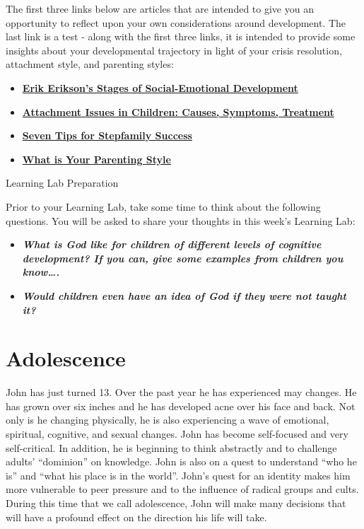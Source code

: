 \documentclass[
]{book}
\providecommand{\tightlist}{%
  \setlength{\itemsep}{0pt}\setlength{\parskip}{0pt}}
\begin{document}
\begin{reflect}
The first three links below are articles that are intended to give you an opportunity to reflect upon your own considerations around development. The last link is a test - along with the first three links, it is intended to provide some insights about your developmental trajectory in light of your crisis resolution, attachment style, and parenting styles:

\begin{itemize}
\tightlist
\item
  \href{http://www.childdevelopmentinfo.com/development/erickson.shtml}{\textbf{Erik Erikson's Stages of Social-Emotional Development}}\\
\item
  \href{https://www.helpguide.org/articles/childhood-issues/attachment-issues-in-children.htm}{\textbf{Attachment Issues in Children: Causes, Symptoms, Treatment}}\\
\item
  \href{https://www.gottman.com/blog/seven-tips-for-stepfamily-success/}{\textbf{Seven Tips for Stepfamily Success}}
\item
  \href{https://www.3smartcubes.com/pages/tests/parentingstyle/parentingstyle_instructions/}{\textbf{What is Your Parenting Style}}
\end{itemize}

{Learning Lab Preparation}

Prior to your Learning Lab, take some time to think about the following questions. You will be asked to share your thoughts in this week's Learning Lab:

\begin{itemize}
\tightlist
\item
  \textbf{\emph{What is God like for children of different levels of cognitive development? If you can, give some examples from children you know\ldots.}}\\
\item
  \textbf{\emph{Would children even have an idea of God if they were not taught it?}}
\end{itemize}
\end{reflect}

\hypertarget{adolescence}{%
\section{Adolescence}\label{adolescence}}

John has just turned 13. Over the past year he has experienced may changes. He has grown over six inches and he has developed acne over his face and back. Not only is he changing physically, he is also experiencing a wave of emotional, spiritual, cognitive, and sexual changes. John has become self-focused and very self-critical. In addition, he is beginning to think abstractly and to challenge adults' ``dominion'' on knowledge. John is also on a quest to understand ``who he is'' and ``what his place is in the world''. John's quest for an identity makes him more vulnerable to peer pressure and to the influence of radical groups and cults. During this time that we call adolescence, John will make many decisions that will have a profound effect on the direction his life will take.
\end{document}
